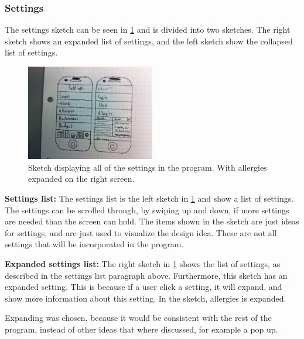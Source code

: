 \subsubsection{Settings}
The settings sketch can be seen in \cref{SettingsScreen} and is divided into two sketches. The right sketch shows an expanded list of settings, and the left sketch show the collapsed list of settings.

\begin{figure}[H]
	\centering
    \includegraphics[width=0.5\textwidth]{Grafik/FoodPlanner/FinalSettingsSketch}
	\caption{Sketch displaying all of the settings in the program. With allergies expanded on the right screen.}
	\label{SettingsScreen}
\end{figure}

\textbf{Settings list:}
The settings list is the left sketch in \cref{SettingsScreen} and show a list of settings. The settings can be scrolled through, by swiping up and down, if more settings are needed than the screen can hold. The items shown in the sketch are just ideas for settings, and are just used to visualize the design idea. These are not all settings that will be incorporated in the program.

\textbf{Expanded settings list:}
The right sketch in \cref{SettingsScreen} shows the list of settings, as described in the settings list paragraph above. Furthermore, this sketch has an expanded setting. This is because if a user click a setting, it will expand, and show more information about this setting. In the sketch, allergies is expanded.

Expanding was chosen, because it would be consistent with the rest of the program, instead of other ideas that where discussed, for example a pop up. 
